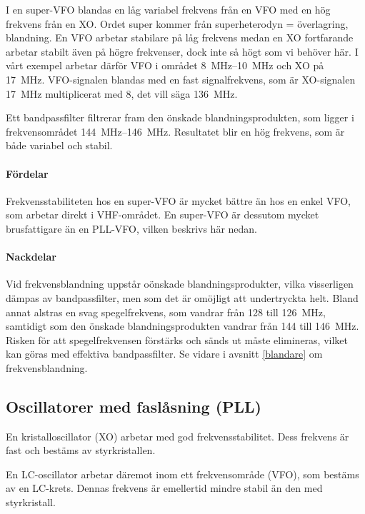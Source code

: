 I en super-VFO blandas en låg variabel frekvens från en VFO med en hög
frekvens från en XO.
Ordet super kommer från superheterodyn = överlagring, blandning.
En VFO arbetar stabilare på låg frekvens medan en XO fortfarande arbetar
stabilt även på högre frekvenser, dock inte så högt som vi behöver här.
I vårt exempel arbetar därför VFO i området \SIrange{8}{10}{\mega\hertz} och XO
på \SI{17}{\mega\hertz}.
VFO-signalen blandas med en fast signalfrekvens, som är XO-signalen
\SI{17}{\mega\hertz} multiplicerat med 8, det vill säga \SI{136}{\mega\hertz}.

Ett bandpassfilter filtrerar fram den önskade blandningsprodukten, som
ligger i frekvensområdet \SIrange{144}{146}{\mega\hertz}.
Resultatet blir en hög frekvens, som är både variabel och stabil.

\paragraph{Fördelar}
Frekvensstabiliteten hos en super-VFO är mycket bättre än hos en enkel VFO,
som arbetar direkt i VHF-området.
En super-VFO är dessutom mycket brusfattigare än en PLL-VFO, vilken
beskrivs här nedan.

\paragraph{Nackdelar}
Vid frekvensblandning uppstår oönskade blandningsprodukter, vilka visserligen
dämpas av bandpassfilter, men som det är omöjligt att undertryckta helt.
Bland annat alstras en svag spegelfrekvens, som vandrar från 128 till
\SI{126}{\mega\hertz}, samtidigt som den önskade blandningsprodukten vandrar
från 144 till \SI{146}{\mega\hertz}.
Risken för att spegelfrekvensen förstärks och sänds ut måste elimineras, vilket
kan göras med effektiva bandpassfilter.
Se vidare i avsnitt \ref{blandare} om frekvensblandning.

\subsection{Oscillatorer med faslåsning (PLL)}
\label{PLL}

En kristalloscillator (XO) arbetar med god frekvensstabilitet.
Dess frekvens är fast och bestäms av styrkristallen.

En LC-oscillator arbetar däremot inom ett frekvensområde (VFO), som bestäms av
en LC-krets.
Dennas frekvens är emellertid mindre stabil än den med styrkristall.

